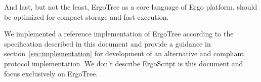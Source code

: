 \documentclass[11pt]{article}
\newcommand{\ASDag}{ErgoTree\xspace}
\begin{document}
And last, but not the least, \ASDag as a core language of Ergo platform, should be
optimized for compact storage and fast execution.  

We implemented a reference implementation of \ASDag according to the specification
described in this document and provide a guidance in section~\ref{sec:implementation}
for development of an alternative and compliant protocol implementation.
We don't describe ErgoScript is this document and focus exclusively on \ASDag.












% 





\appendix






\end{document}
